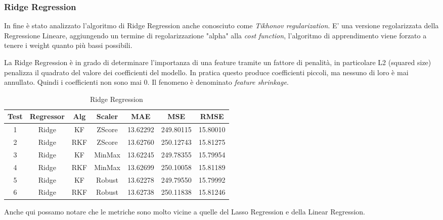 \subsubsection{Ridge Regression}
\fancyhead[]{}

In fine è stato analizzato l’algoritmo di Ridge Regression anche conosciuto come \textit{Tikhonov
regularization}. E’ una versione regolarizzata della Regressione Lineare, aggiungendo un
termine di regolarizzazione "alpha" alla \textit{cost function}, l’algoritmo di apprendimento viene
forzato a tenere i weight quanto più bassi possibili. 

La Ridge Regression è in grado di determinare l’importanza di una feature tramite un fattore
di penalità, in particolare L2 (squared size) penalizza il quadrato del valore dei coefficienti
del modello. In pratica questo produce coefficienti piccoli, ma nessuno di loro è mai annullato.
Quindi i coefficienti non sono mai 0. Il fenomeno è denominato \textit{feature shrinkage}.

\begin{table}[!htbp]
    \centering
    \caption{Ridge Regression}
    \begin{tabular}{|c|c|c|c|c|c|c|}
        \hline
        Test & Regressor & Alg & Scaler & MAE & MSE & RMSE \\
        \hline
        1 & Ridge & KF & ZScore & 13.62292 & 249.80115 & 15.80010 \\
        \hline
        2 & Ridge & RKF & ZScore & 13.62760 & 250.12743 & 15.81275 \\
        \hline
        3 & Ridge & KF & MinMax & 13.62245 & 249.78355 & 15.79954 \\
        \hline
        4 & Ridge & RKF & MinMax & 13.62699 & 250.10058 & 15.81189 \\
        \hline
        5 & Ridge & KF & Robust & 13.62278 & 249.79550 & 15.79992 \\
        \hline
        6 & Ridge & RKF & Robust & 13.62738 & 250.11838 & 15.81246 \\
        \hline
    \end{tabular}
    \label{tab:random_forest}
\end{table} 

Anche qui possamo notare che le metriche sono molto vicine a quelle del Lasso Regression e della Linear Regression.